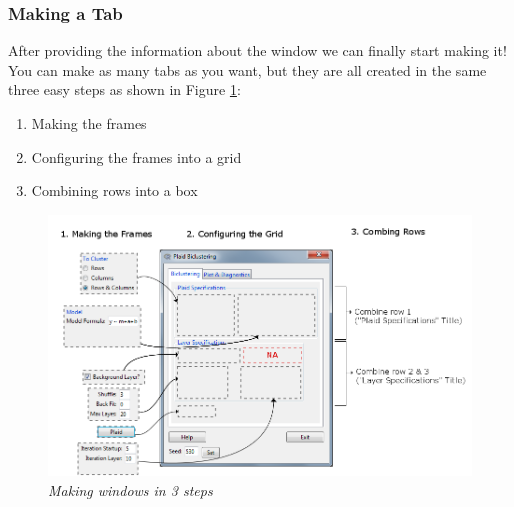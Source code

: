 \documentclass[a4paper]{article}\usepackage[]{graphicx}\usepackage[]{color}
\begin{document}
\subsubsection{Making a Tab}
After providing the information about the window we can finally start making
it! You can make as many tabs as you want, but they are all created in the same
three easy steps as shown in Figure \ref{3steps}:
\begin{enumerate}
\item Making the frames
\item Configuring the frames into a grid
\item Combining rows into a box
\end{enumerate}

\begin{figure}[H]
\centering
\includegraphics[width=\linewidth]{figures/3steps.png}
\caption{{\it Making windows in 3 steps}
\label{3steps}}
\end{figure}
\end{document}

